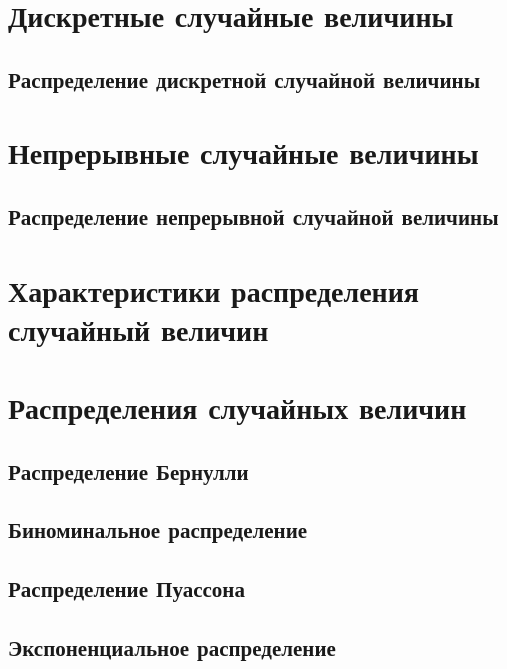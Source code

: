 \documentclass[
  letterpaper,
  DIV=11,
  numbers=noendperiod]{scrreprt}
\theoremstyle{definition}
\theoremstyle{remark}
\begin{document}
\section{Дискретные случайные
величины}\label{stats-rand-values-discrete}

\subsection{Распределение дискретной случайной
величины}\label{stats-rand-values-discrete-distribution}

\section{Непрерывные случайные
величины}\label{stats-rand-values-continuous}

\subsection{Распределение непрерывной случайной
величины}\label{stats-rand-values-continuous-distribution}

\section{Характеристики распределения случайный
величин}\label{stats-rand-values-moments}

\section{Распределения случайных
величин}\label{stats-rand-values-distributions}

\subsection{Распределение Бернулли}\label{stats-rand-values-bernoulli}

\subsection{Биноминальное распределение}\label{stats-rand-values-binom}

\subsection{Распределение Пуассона}\label{stats-rand-values-pois}

\subsection{Экспоненциальное распределение}\label{stats-rand-values-exp}
\end{document}
